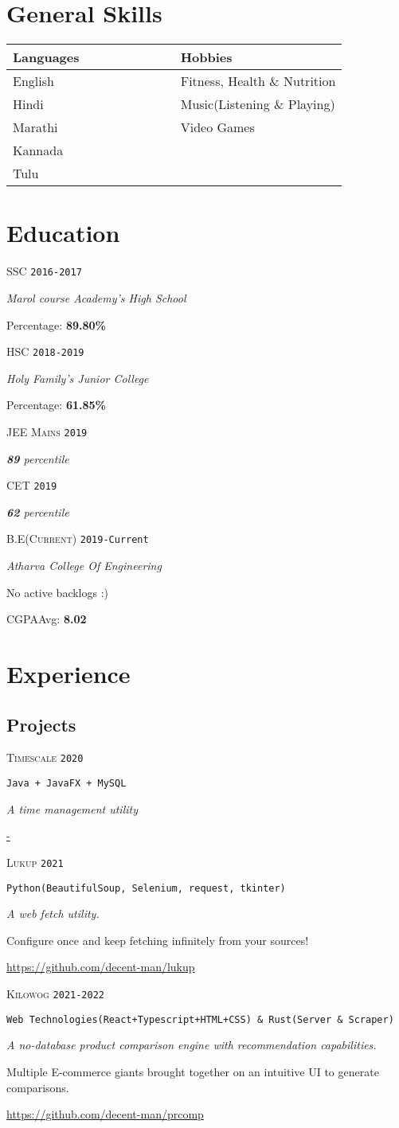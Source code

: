 \documentclass{article}
\newcommand{\school}{Marol course Academy's High School}
\newcommand{\hischool}{Holy Family's Junior College}
\newcommand{\college}{Atharva College Of Engineering}
\newcommand{\halfwidth}{0.50\linewidth}
\newcommand{\course}[6]{
	\begin{minipage}[t]{.15\textwidth}
		\hfill \large \textsc{#1}\hspace{1cm}\linebreak[4]
		\vspace{1cm}
		\hfill \footnotesize \texttt{#2}
	\end{minipage}
	\hfill\vline\hfill
	\begin{minipage}[t]{.80\textwidth}
		\large \textsl{#3}

		#6
		
		#4: \textbf{#5}
	\end{minipage}
}
\newcommand{\currentsep}{
	\begin{center}
		\dotfill
	\end{center}
}
\newcommand{\entrance}[3]{
	\begin{minipage}[t]{.15\textwidth}
		\hfill \large \textsc{#1}\hspace{1cm}\linebreak[4]
		\vspace{1cm}
		\hfill \footnotesize \texttt{#2}
	\end{minipage}
	\hfill\vline\hfill
	\begin{minipage}[t]{.80\textwidth}
		\textsl{\textbf{#3} percentile}
	\end{minipage}
}
\newcommand{\project}[6]{
	\begin{minipage}[t]{.15\textwidth}
		\hfill \textsc{#1}\linebreak[4]
		\vspace{1cm}
		\hfill \footnotesize \texttt{#2}
	\end{minipage}
	\hfill\vline\hfill
	\begin{minipage}[t]{.80\textwidth}

		\texttt{#3}

		\textsl{#4}

		\footnotesize{#5}

		\url{#6}

		\dotfill
	\end{minipage}
}
\begin{document}
	\section{General Skills}
		\begin{table}[h!]
			\begin{tabular}[c]{|p{\halfwidth}|p{\halfwidth}|}
					\toprule
					\textbf{Languages}		& 	\textbf{Hobbies}			\\
					\midrule
					English					&	Fitness, Health \& Nutrition	\\
					Hindi					&   Music(Listening \& Playing)		\\
					Marathi					&   Video Games						\\
					Kannada					&									\\
					Tulu					&									\\
					\bottomrule
				\end{tabular}
		\end{table}

	\section{Education}
		\course{SSC}
			{2016-2017} 
			{\school}
			{Percentage}
			{89.80\%}
			{}
		\course{HSC}
			{2018-2019} 
			{\hischool}
			{Percentage}
			{61.85\%}
			{}
		\entrance{JEE Mains}{2019}{89}
		\entrance{CET}{2019}{62}
		\currentsep
		\course{B.E\scriptsize(Current)}
			{2019-Current}
			{\college}
			{CGPA\scriptsize Avg\large}
			{8.02}
			{No active backlogs :)}
		\currentsep
	\newpage
	\section{Experience}
		\subsection{Projects}
				\project{Timescale}
				{2020}
				{Java + JavaFX + MySQL}
				{A time management utility}
				{}
				{-}
				\project{Lukup}
				{2021}
				{Python(BeautifulSoup, Selenium, request, tkinter)}
				{A web fetch utility.}
				{Configure once and keep fetching infinitely from your sources!}
				{https://github.com/decent-man/lukup}
				\project{Kilowog}
				{2021-2022}
				{Web Technologies(React+Typescript+HTML+CSS) \& Rust(Server \& Scraper)}
				{A no-database product comparison engine with recommendation capabilities.}
				{Multiple E-commerce giants brought together on an intuitive UI to generate comparisons.}
				{https://github.com/decent-man/prcomp}
\end{document}
